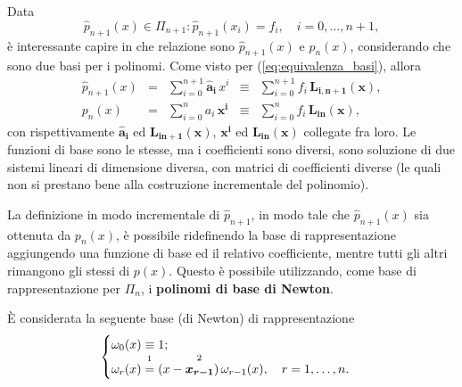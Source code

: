 \noindent Data
\begin{equation*}
	\widehat{p}_{n+1}(x)\in\Pi_{n+1}:\widehat{p}_{n+1}(x_i)=f_i,\quad i=0,\hdots,n+1,
\end{equation*}
è interessante capire in che relazione sono $\widehat{p}_{n+1}(x)$ e $p_n(x)$, considerando che sono due basi per i polinomi. Come visto per (\ref{eq:equivalenza_basi}), allora
\begin{equation}
	\begin{matrix}
		\widehat{p}_{n+1}(x)&=&\sum_{i=0}^{n+1}\boldsymbol{\widehat{a}_i}\, x^i&\equiv&\sum_{i=0}^{n+1} f_i\, \boldsymbol{L_{i,n+1}(x)},\\
		p_n(x)&=&\sum_{i=0}^n a_i\,\boldsymbol{x^i}&\equiv&\sum_{i=0}^n f_i\, \boldsymbol{L_{in}(x)},
	\end{matrix}
\end{equation}
con rispettivamente $\boldsymbol{\widehat{a}_i}$ ed $\boldsymbol{L_{in+1}(x)}$, $\boldsymbol{x^i}$ ed $\boldsymbol{L_{in}(x)}$ collegate fra loro.
Le funzioni di base sono le stesse, ma i coefficienti sono diversi, sono soluzione di due sistemi lineari di dimensione diversa, con matrici di coefficienti diverse (le quali non si prestano bene alla costruzione incrementale del polinomio). 

La definizione in modo incrementale di $\widehat{p}_{n+1}$, in modo tale che $\widehat p_{n+1}(x)$ sia ottenuta da $p_n(x)$, è possibile ridefinendo la base di  rappresentazione aggiungendo una funzione di base ed il relativo coefficiente, mentre tutti gli altri rimangono gli stessi di $p(x)$. Questo è possibile utilizzando, come base di rappresentazione per $\Pi_n$, i \textbf{polinomi di base di Newton}.

\begin{definition}
	È considerata la seguente base (di Newton) di rappresentazione
	\begin{equation}\label{eq:polinomio_base_newton}
	    \begin{cases}
	        \omega_0(x)\equiv 1;\\
			\omega_r(x)\overset{\footnotemark}{=}(x-\overset{\footnotemark}{\boldsymbol{x_{r-1}}})\,\omega_{r-1}(x),\quad r=1,\hdots,n.
	    \end{cases}
	\end{equation}
\end{definition}
\addtocounter{footnote}{-1}


